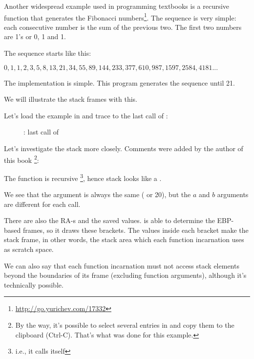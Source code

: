 
Another widespread example used in programming textbooks is a recursive function 
that generates the Fibonacci numbers\footnote{\url{http://go.yurichev.com/17332}}.
The sequence is very simple: each consecutive number is the sum of the previous two.
The first two numbers are 1's or 0, 1 and 1.

The sequence starts like this:

\begin{center}
$0, 1, 1, 2, 3, 5, 8, 13, 21, 34, 55, 89, 144, 233, 377, 610, 987, 1597, 2584, 4181 ...$
\end{center}


The implementation is simple. This program generates the sequence until 21.





We will illustrate the stack frames with this.

\clearpage

Let's load the example in \olly and trace to the last call of \ttf{}:

\begin{figure}[H]
\centering
{}
\caption{\olly: last call of \ttf{}}
\label{fig:fib_olly}
\end{figure}

\clearpage
Let's investigate the stack more closely. 
Comments were added by the author of this book
\footnote{By the way, it's possible to select several entries in \olly and copy them to the clipboard (Ctrl-C).
That's what was done for this example.}:



The function is recursive \footnote{i.e., it calls itself}, hence stack looks like a .

We see that the  argument is always the same ( or 20), but the $a$ and $b$ arguments are different for each call.

There are also the \ac{RA}-s and the saved \EBP values.
\olly is able to determine the EBP-based frames, so it draws these brackets.
The values inside each bracket make the \gls{stack frame}, 
in other words, the stack area which each function incarnation uses as scratch space. 

We can also say that each function incarnation must not access
stack elements beyond the boundaries of its frame (excluding function arguments), 
although it's technically possible. 

